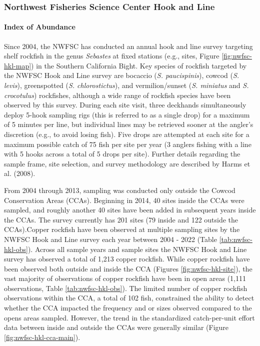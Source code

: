 \documentclass[11pt,
  english,
  letterpaper,
]{article}
\begin{document}
\hypertarget{northwest-fisheries-science-center-hook-and-line}{%
\subsubsection{Northwest Fisheries Science Center Hook and Line}\label{northwest-fisheries-science-center-hook-and-line}}

\hypertarget{index-of-abundance-1}{%
\paragraph{Index of Abundance}\label{index-of-abundance-1}}

\hfill\break

Since 2004, the NWFSC has conducted an annual hook and line survey targeting shelf rockfish in the genus \emph{Sebastes} at fixed stations (e.g., sites, Figure \ref{fig:nwfsc-hkl-map}) in the Southern California Bight. Key species of rockfish targeted by the NWFSC Hook and Line survey are bocaccio (\emph{S. paucispinis}), cowcod (\emph{S. levis}), greenspotted (\emph{S. chlorostictus}), and vermilion/sunset (\emph{S. miniatus} and \emph{S. crocotulus}) rockfishes, although a wide range of rockfish species have been observed by this survey. During each site visit, three deckhands simultaneously deploy 5-hook sampling rigs (this is referred to as a single drop) for a maximum of 5 minutes per line, but individual lines may be retrieved sooner at the angler's discretion (e.g., to avoid losing fish). Five drops are attempted at each site for a maximum possible catch of 75 fish per site per year (3 anglers fishing with a line with 5 hooks across a total of 5 drops per site). Further details regarding the sample frame, site selection, and survey methodology are described by Harms et al. (2008).

From 2004 through 2013, sampling was conducted only outside the Cowcod Conservation Areas (CCAs). Beginning in 2014, 40 sites inside the CCAs were sampled, and roughly another 40 sites have been added in subsequent years inside the CCAs. The survey currently has 201 sites (79 inside and 122 outside the CCAs).Copper rockfish have been observed at multiple sampling sites by the NWFSC Hook and Line survey each year between 2004 - 2022 (Table \ref{tab:nwfsc-hkl-obs}). Across all sample years and sample sites the NWFSC Hook and Line survey has observed a total of 1,213 copper rockfish. While copper rockfish have been observed both outside and inside the CCA (Figures \ref{fig:nwfsc-hkl-site}), the vast majority of observations of copper rockfish have been in open areas (1,111 observations, Table \ref{tab:nwfsc-hkl-obs}). The limited number of copper rockfish observations within the CCA, a total of 102 fish, constrained the ability to detect whether the CCA impacted the frequency and or sizes observed compared to the opens areas sampled. However, the trend in the standardized catch-per-unit effort data between inside and outside the CCAs were generally similar (Figure \ref{fig:nwfsc-hkl-cca-main}).
\end{document}
